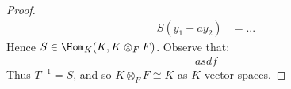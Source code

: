 \begin{proof}
\begin{equation*}
                \begin{split}
                    S(y_1 + a y_2)
                    & = ... 
                \end{split}
                \end{equation*}
            Hence $S \in \Hom_K(K,K \otimes_F F)$. Observe that:
                \begin{equation*}
                \begin{split}
                    asdf
                \end{split}
                \end{equation*}
            Thus $T^{-1} = S$, and so $K \otimes_F F  \cong K$ as $K$-vector spaces.
        \end{proof}
